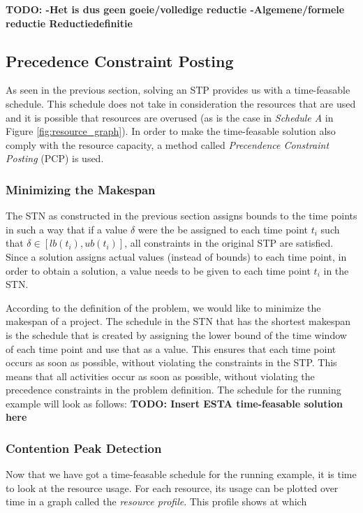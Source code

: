 \documentclass{article}
\theoremstyle{definition}
\newcommand{\TODO}[1]{{\color{red}\textbf{TODO: #1}}}
\begin{document}
\TODO{
		-Het is dus geen goeie/volledige reductie
		-Algemene/formele reductie Reductiedefinitie
	}

\subsection{Precedence Constraint Posting}
\label{text:PCP}
As seen in the previous section, solving an STP provides us with a time-feasable schedule. 
This schedule does not take in consideration the resources that are used and it is possible that resources are overused (as is the case in \emph{Schedule A} in Figure \ref{fig:resource_graph}). 
In order to make the time-feasable solution also comply with the resource capacity, a method called \emph{Precendence Constraint Posting} (PCP) is used. 

\subsubsection{Minimizing the Makespan}
The STN as constructed in the previous section assigns bounds to the time points in such a way that if a value $\delta$ were the be assigned to each time point $t_i$ such that $\delta \in [lb(t_i), ub(t_i)]$, all constraints in the original STP are satisfied.
Since a solution assigns actual values (instead of bounds) to each time point, in order to obtain a solution, a value needs to be given to each time point $t_i$ in the STN.

According to the definition of the problem, we would like to minimize the makespan of a project. The schedule in the STN that has the shortest makespan is the schedule that is created by assigning the lower bound of the time window of each time point and use that as a value. This ensures that each time point occurs as soon as possible, without violating the constraints in the STP. This means that all activities occur as soon as possible, without violating the precedence constraints in the problem definition. The schedule for the running example will look as follows:
\TODO{Insert ESTA time-feasable solution here}

\subsubsection{Contention Peak Detection}
Now that we have got a time-feasable schedule for the running example, it is time to look at the resource usage. For each resource, its usage can be plotted over time in a graph called the \emph{resource profile}. This profile shows at which
\end{document}
